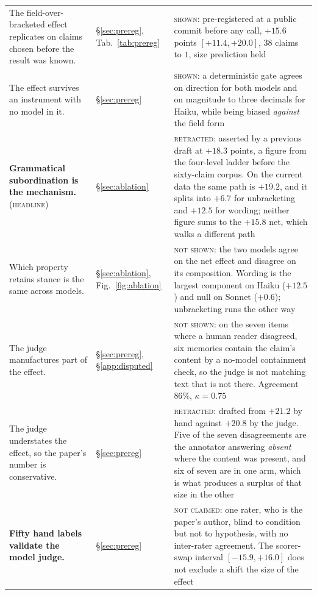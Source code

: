 \documentclass[11pt]{article}
\begin{document}
{\begin{longtable}{@{}L{0.46\textwidth} L{0.18\textwidth} L{0.28\textwidth}@{}}
The field-over-bracketed effect replicates on claims chosen before the result was known.
& \S\ref{sec:prereg}, Tab.~\ref{tab:prereg} & \textsc{shown}: pre-registered at a public
commit before any call, $+15.6$ points $[+11.4,+20.0]$, $38$ claims to $1$, size
prediction held \\

The effect survives an instrument with no model in it. & \S\ref{sec:prereg} &
\textsc{shown}: a deterministic gate agrees on direction for both models and on magnitude
to three decimals for Haiku, while being biased \emph{against} the field form \\

\textbf{Grammatical subordination is the mechanism.} \textsc{(headline)} &
\S\ref{sec:ablation} & \textsc{retracted}: asserted by a previous draft at $+18.3$ points,
a figure from the four-level ladder before the sixty-claim corpus. On the current data the
same path is $+19.2$, and it splits into $+6.7$ for unbracketing and $+12.5$ for wording;
neither figure sums to the $+15.8$ net, which walks a different path \\

Which property retains stance is the same across models. & \S\ref{sec:ablation},
Fig.~\ref{fig:ablation} & \textsc{not shown}: the two models agree on the net
effect and disagree on its composition. Wording is the largest component on
Haiku ($+12.5$) and null on Sonnet ($+0.6$); unbracketing runs the other way \\

The judge manufactures part of the effect. & \S\ref{sec:prereg},
\S\ref{app:disputed} & \textsc{not shown}: on the seven items where a human reader
disagreed, six memories contain the claim's content by a no-model containment check, so
the judge is not matching text that is not there. Agreement $86\%$, $\kappa=0.75$ \\

The judge understates the effect, so the paper's number is conservative. &
\S\ref{sec:prereg} & \textsc{retracted}: drafted from $+21.2$ by hand against $+20.8$ by
the judge. Five of the seven disagreements are the annotator answering \emph{absent} where
the content was present, and six of seven are in one arm, which is what produces a surplus
of that size in the other \\

\textbf{Fifty hand labels validate the model judge.} & \S\ref{sec:prereg} &
\textsc{not claimed}: one rater, who is the paper's author, blind to condition but not to
hypothesis, with no inter-rater agreement. The scorer-swap interval $[-15.9,+16.0]$ does
not exclude a shift the size of the effect \\


\end{longtable}}
\end{document}
